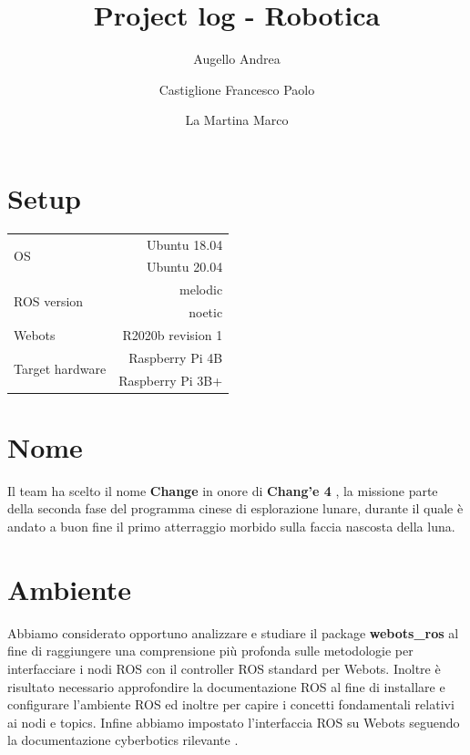 \documentclass[a4paper]{article}
\begin{document}
	\title{Project log - Robotica}
	\author{Augello Andrea \and Castiglione Francesco Paolo \and La Martina Marco}
	\maketitle
	\tableofcontents

	\section{Setup}\label{sec:Setup}
	\begin{tabular}{|l|r|}
		\hline
		\multirow{2}{4em}{OS} & Ubuntu 18.04 \\
							  & Ubuntu 20.04 \\ \hline
		\multirow{2}{6em}{ROS version} & melodic \\
									   & noetic \\ \hline
		Webots & R2020b revision 1\\ \hline
		\multirow{2}{11em}{Target hardware} & Raspberry Pi 4B \\
											& Raspberry Pi 3B+ \\ \hline
	\end{tabular}

	\section{Nome}\label{sec:Name}
	Il team ha scelto il nome \textbf{Change} in onore di \textbf{Chang'e 4} \cite{change4}, la missione parte della seconda fase del programma cinese di esplorazione lunare, durante il quale è andato a buon fine il primo atterraggio morbido sulla faccia nascosta della luna. 

	\section{Ambiente}\label{sec:Libraries}
	Abbiamo considerato opportuno analizzare e studiare il package \textbf{webots\_ros} \cite{webotsRos} al fine di raggiungere una comprensione più profonda sulle metodologie per interfacciare i nodi ROS con il controller ROS standard per Webots. Inoltre è risultato necessario approfondire la documentazione ROS \cite{rosTutorial} al fine di installare e configurare l'ambiente ROS ed inoltre per capire i concetti fondamentali relativi ai nodi e topics. Infine abbiamo impostato l'interfaccia ROS su Webots seguendo la documentazione cyberbotics rilevante \cite{rosTutorial}.
	
\end{document}

